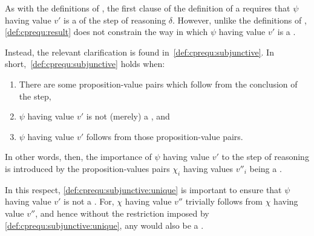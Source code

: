 \begin{note}
  As with the definitions of , the first clause of the definition of a \cprequ{} requires that \(\psi\) having value \(v'\) is a  of the step of reasoning \(\delta\).
  However, unlike the definitions of , \ref{def:cprequ:result} does not constrain the way in which \(\psi\) having value \(v'\) is a .

  Instead, the relevant clarification is found in~\ref{def:cprequ:subjunctive}.
  In short,~\ref{def:cprequ:subjunctive} holds when:
  \begin{enumerate}[label=\alph*.]
  \item There are some proposition-value pairs which follow from the conclusion of the step,
  \item \(\psi\) having value \(v'\) is not (merely) a \crequ{}, and
  \item \(\psi\) having value \(v'\) follows from those proposition-value pairs.
  \end{enumerate}
  In other words, then, the importance of \(\psi\) having value \(v'\) to the step of reasoning is introduced by the proposition-values pairs \(\chi_{i}\) having values \(v''_{i}\) being a \crequ{}.

  In this respect, \ref{def:cprequ:subjunctive:unique} is important to ensure that \(\psi\) having value \(v'\) is not a \crequ{}.
  For, \(\chi\) having value \(v''\) trivially follows from \(\chi\) having value \(v''\), and hence without the restriction imposed by \ref{def:cprequ:subjunctive:unique}, any \crequ{} would also be a \cprequ{}.
\end{note}

